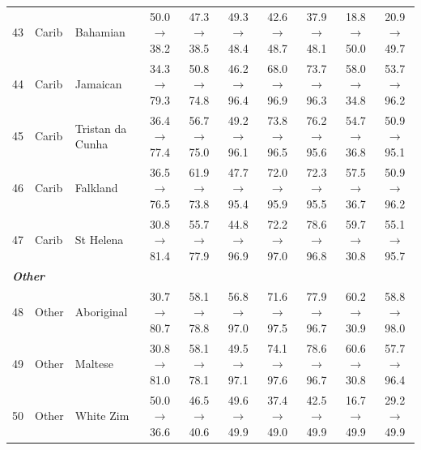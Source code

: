 \begin{table}[t]
{\begin{tabular}{rll c c c c c c c}
43 & Carib & Bahamian & 50.0$\rightarrow$38.2 & 47.3$\rightarrow$38.5 & 49.3$\rightarrow$48.4 & 42.6$\rightarrow$48.7 & 37.9$\rightarrow$48.1 & 18.8$\rightarrow$50.0 & 20.9$\rightarrow$49.7 \\
44 & Carib & Jamaican & 34.3$\rightarrow$79.3 & 50.8$\rightarrow$74.8 & 46.2$\rightarrow$96.4 & 68.0$\rightarrow$96.9 & 73.7$\rightarrow$96.3 & 58.0$\rightarrow$34.8 & 53.7$\rightarrow$96.2 \\
45 & Carib & Tristan da Cunha & 36.4$\rightarrow$77.4 & 56.7$\rightarrow$75.0 & 49.2$\rightarrow$96.1 & 73.8$\rightarrow$96.5 & 76.2$\rightarrow$95.6 & 54.7$\rightarrow$36.8 & 50.9$\rightarrow$95.1 \\
46 & Carib & Falkland & 36.5$\rightarrow$76.5 & 61.9$\rightarrow$73.8 & 47.7$\rightarrow$95.4 & 72.0$\rightarrow$95.9 & 72.3$\rightarrow$95.5 & 57.5$\rightarrow$36.7 & 50.9$\rightarrow$96.2 \\
47 & Carib & St Helena & 30.8$\rightarrow$81.4 & 55.7$\rightarrow$77.9 & 44.8$\rightarrow$96.9 & 72.2$\rightarrow$97.0 & 78.6$\rightarrow$96.8 & 59.7$\rightarrow$30.8 & 55.1$\rightarrow$95.7 \\
\midrule
\multicolumn{10}{l}{\textit{\textbf{Other}}} \\
48 & Other & Aboriginal & 30.7$\rightarrow$80.7 & 58.1$\rightarrow$78.8 & 56.8$\rightarrow$97.0 & 71.6$\rightarrow$97.5 & 77.9$\rightarrow$96.7 & 60.2$\rightarrow$30.9 & 58.8$\rightarrow$98.0 \\
49 & Other & Maltese & 30.8$\rightarrow$81.0 & 58.1$\rightarrow$78.1 & 49.5$\rightarrow$97.1 & 74.1$\rightarrow$97.6 & 78.6$\rightarrow$96.7 & 60.6$\rightarrow$30.8 & 57.7$\rightarrow$96.4 \\
50 & Other & White Zim & 50.0$\rightarrow$36.6 & 46.5$\rightarrow$40.6 & 49.6$\rightarrow$49.9 & 37.4$\rightarrow$49.0 & 42.5$\rightarrow$49.9 & 16.7$\rightarrow$49.9 & 29.2$\rightarrow$49.9 \\
\bottomrule
\end{tabular}
}
\end{table}
